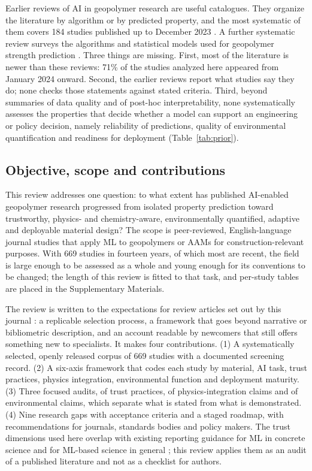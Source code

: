 \documentclass[pdflatex,sn-basic]{sn-jnl}
\begin{document}
Earlier reviews of AI in geopolymer research are useful catalogues. They organize the literature by algorithm or by predicted property, and the most systematic of them covers 184 studies published up to December 2023 \citep{nguyen2025}. A further systematic review surveys the algorithms and statistical models used for geopolymer strength prediction \citep{matsimbe2024}. Three things are missing. First, most of the literature is newer than these reviews: 71\% of the studies analyzed here appeared from January 2024 onward. Second, the earlier reviews report what studies say they do; none checks those statements against stated criteria. Third, beyond summaries of data quality and of post-hoc interpretability, none systematically assesses the properties that decide whether a model can support an engineering or policy decision, namely reliability of predictions, quality of environmental quantification and readiness for deployment (Table~\ref{tab:prior}).

\subsection{Objective, scope and contributions}

This review addresses one question: to what extent has published AI-enabled geopolymer research progressed from isolated property prediction toward trustworthy, physics- and chemistry-aware, environmentally quantified, adaptive and deployable material design? The scope is peer-reviewed, English-language journal studies that apply ML to geopolymers or AAMs for construction-relevant purposes. With 669 studies in fourteen years, of which most are recent, the field is large enough to be assessed as a whole and young enough for its conventions to be changed; the length of this review is fitted to that task, and per-study tables are placed in the Supplementary Materials.

The review is written to the expectations for review articles set out by this journal \citep{araujo2025}: a replicable selection process, a framework that goes beyond narrative or bibliometric description, and an account readable by newcomers that still offers something new to specialists. It makes four contributions. (1) A systematically selected, openly released corpus of 669 studies with a documented screening record. (2) A six-axis framework that codes each study by material, AI task, trust practices, physics integration, environmental function and deployment maturity. (3) Three focused audits, of trust practices, of physics-integration claims and of environmental claims, which separate what is stated from what is demonstrated. (4) Nine research gaps with acceptance criteria and a staged roadmap, with recommendations for journals, standards bodies and policy makers. The trust dimensions used here overlap with existing reporting guidance for ML in concrete science \citep{li2022} and for ML-based science in general \citep{kapoor2024}; this review applies them as an audit of a published literature and not as a checklist for authors.
\end{document}
